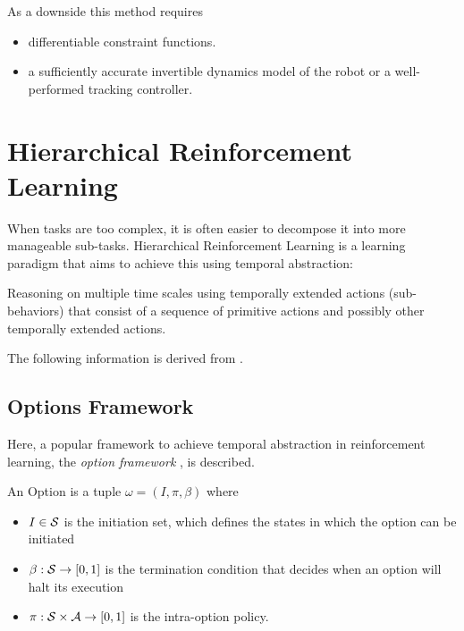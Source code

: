 As a downside this method requires
\begin{itemize}
    \item differentiable constraint functions.
    \item a sufficiently accurate invertible dynamics model of the robot or a well-performed tracking controller.
\end{itemize}



\section{Hierarchical Reinforcement Learning}
When tasks are too complex, it is often easier to decompose it into more manageable sub-tasks. Hierarchical Reinforcement Learning
is a learning paradigm that aims to achieve this using temporal abstraction:

Reasoning on multiple time scales using temporally extended actions (sub-behaviors) that consist of a sequence of primitive actions
and possibly other temporally extended actions.

The following information is derived from \cite{survey_mdpi}.

\subsection{Options Framework}
Here, a popular framework to achieve temporal abstraction in reinforcement learning, the \textit{option framework} \cite{Options}, is described.

\begin{definition}
    An Option is a tuple $\omega = (I, \pi, \beta)$ where
    \begin{itemize}
        \item $I \in \mathcal{S}$ is the initiation set, which defines the states in which the option can be initiated
        \item $\beta: \mathcal{S} \rightarrow [0, 1]$ is the termination condition that decides when an option will halt its execution
        \item $\pi: \mathcal{S} \times \mathcal{A} \rightarrow [0,1]$ is the intra-option policy.
    \end{itemize}
\end{definition}

